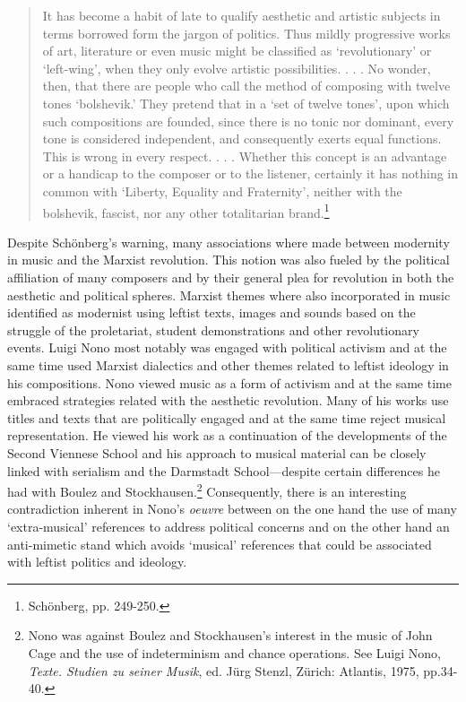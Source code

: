 \begin{quote}
It has become a habit of late to qualify aesthetic and artistic subjects in terms borrowed form the jargon of politics. Thus mildly progressive works of art, literature or even music might be classified as `revolutionary' or `left-wing', when they only evolve artistic possibilities. . . . No wonder, then, that there are people who call the method of composing with twelve tones `bolshevik.' They pretend that in a `set of twelve tones', upon which such compositions are founded, since there is no tonic nor dominant, every tone is considered independent, and consequently exerts equal functions. This is wrong in every respect. . . . Whether this concept is an advantage or a handicap to the composer or to the listener, certainly it has nothing in common with `Liberty, Equality and Fraternity', neither with the bolshevik, fascist, nor any other totalitarian brand.\footnote{Sch\"{o}nberg, pp. 249-250.}
\end{quote}

Despite Sch\"{o}nberg's warning, many associations where made between modernity in music and the Marxist revolution. This notion was also fueled by the political affiliation of many composers and by their general plea for revolution in both the aesthetic and political spheres. Marxist themes where also incorporated in music identified as modernist using leftist texts, images and sounds based on the struggle of the proletariat, student demonstrations and other revolutionary events. Luigi Nono most notably was engaged with political activism and at the same time used Marxist dialectics and other themes related to leftist ideology in his compositions. Nono viewed music as a form of activism and at the same time embraced strategies related with the aesthetic revolution. Many of his works use titles and texts that are politically engaged and at the same time reject musical representation. He viewed his work as a continuation of the developments of the Second Viennese School and his approach to musical material can be closely linked with serialism and the Darmstadt School---despite certain differences he had with Boulez and Stockhausen.\footnote{Nono was against Boulez and Stockhausen's interest in the music of John Cage and the use of indeterminism and chance operations. See Luigi Nono, \emph{Texte. Studien zu seiner Musik}, ed. J\"{u}rg Stenzl, Z\"{u}rich: Atlantis, 1975, pp.34-40.} Consequently, there is an interesting contradiction inherent in Nono's \emph{oeuvre} between on the one hand the use of many `extra-musical' references to address political concerns and on the other hand an anti-mimetic stand which avoids `musical' references that could be associated with leftist politics and ideology. 

